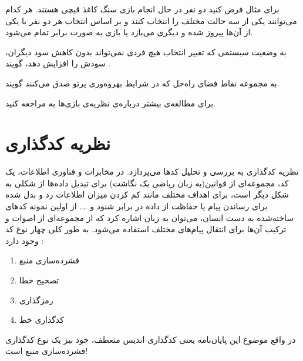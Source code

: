 برای مثال فرض کنید دو نفر در حال انجام بازی سنگ کاغذ قیچی هستند. هر کدام می‌توانند یکی از سه حالت مختلف را انتخاب کنند و بر اساس انتخاب هر دو نفر یا یکی از آن‌ها پیروز شده و دیگری می‌بازد یا بازی به صورت برابر تمام می‌شود.
\begin{definition}
	\label{def:Pareto}
	به وضعیت سیستمی که تغییر انتخاب هیچ فردی نمی‌تواند بدون کاهش سود دیگران، سودش را افزایش دهد، گویند
	\cite{wiki:pareto}.
	\end{definition}
		\begin{definition}
	\label{def:Pareto-boundary}
	به مجموعه نقاط فضای راه‌حل که در شرایط بهروه‌وری پرتو صدق می‌کنند گویند.
\end{definition}

	برای مطالعه‌ی بیشتر درباره‌ی نظریه‌ی بازی‌ها به
\cite{book:game}
مراجعه کنید.
\section{نظریه کدگذاری}
نظریه کدگذاری به بررسی و تحلیل کد‌ها می‌پردازد. در مخابرات و فناوری اطلاعات، یک کد، مجموعه‌‌ای از قوانین(به زبان ریاضی یک نگاشت‌) برای تبدیل داده‌ها از شکلی به شکل دیگر است، برای اهداف مختلف مانند کم‌ کردن میزان اطلاعات رد و بدل‌‌ شده برای رساندن پیام یا حفاظت از داده در برابر شنود و \dots .
از اولین نمونه‌ کدهای ساخته‌شده به دست انسان، می‌توان به زبان اشاره کرد که از مجموعه‌ای از اصوات و ترکیب آن‌ها برای انتقال پیام‌های مختلف استفاده می‌شود. به طور کلی چهار نوع کد وجود دارد \cite{wiki:coding1, wiki:coding2}:
\begin{enumerate}
	\item فشرده‌سازی منبع
	\item تصحیح خطا
	\item رمزگذاری
	\item کدگذاری خط
\end{enumerate}

در واقع موضوع این پایان‌نامه یعنی کدگذاری اندیس منعطف، خود نیز یک نوع کدگذاری فشرده‌سازی منبع است!

